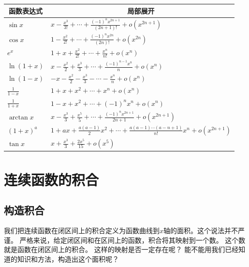 \documentclass[12pt,UTF8]{ctexbook}
\newcommand{\olim}[1]{\mathit{o}\left(#1\right)}  %
\begin{document}
\begin{appendix}
\begin{center}
    \renewcommand{\arraystretch}{2}
    \setlength{\extrarowheight}{-3pt}
    \begin{longtable}{|l|l|}
        \hline \multicolumn{1}{|c|}{\textbf{函数表达式}} & \multicolumn{1}{c|}{\textbf{局部展开}} \\[4pt] 
        \hline    
        $\sin{x}$ & $x - \frac{x^3}{3!} + \cdots + \frac{(-1)^n x^{2n+1}}{(2n+1)!} + \olim{x^{2n+1}} $ \\[4pt]
        \hline
        $\cos{x}$ & $1 - \frac{x^2}{2!} + \cdots + \frac{(-1)^n x^{2n}}{(2n)!} + \olim{x^{2n}} $ \\[4pt]
        \hline
        $e^x$ & $1 + x + \frac{x^2}{2!} + \cdots + \frac{x^n}{n!} + \olim{x^n}$ \\[4pt]
        \hline
        $\ln{(1 + x)}$ & $x - \frac{x^2}{2} + \frac{x^3}{3} + \cdots + \frac{(-1)^{n-1}x^{n}}{n} + \olim{x^{n}}$ \\[4pt]  
        \hline
        $\ln{(1 - x)}$ & $- x - \frac{x^2}{2} - \frac{x^3}{3} - \cdots - \frac{x^{n}}{n} + \olim{x^{n}}$ \\[4pt]  
        \hline
        $\frac{1}{1 - x}$ & $1 + x + x^2 + \cdots + x^n + \olim{x^{n}}$ \\[4pt]  
        \hline
        $\frac{1}{1 + x}$ & $1 - x + x^2 + \cdots + (-1)^n x^n + \olim{x^{n}}$ \\[4pt]  
        \hline
        $\arctan{x}$ & $x - \frac{x^3}{3} + \frac{x^5}{5} + \cdots + \frac{(-1)^n x^{2n+1}}{2n+1} + \olim{x^{2n+1}}$ \\[4pt]  
        \hline
        $(1 + x)^a$ & $1 + ax + \frac{a(a - 1)}{2}x^2 + \cdots + \frac{a(a - 1)\cdots(a - n + 1)}{n!}x^n + \olim{x^{2n+1}}$ \\[4pt] 
        \hline
        $\tan{x}$ & $x + \frac{x^3}{3} + \frac{2x^5}{15} + \olim{x^{5}}$ \\[4pt]
        \hline
    \end{longtable}
\end{center}

\chapter{连续函数的积合}

\section{构造积合}

我们把连续函数在闭区间上的积合定义为函数曲线到$x$轴的面积。这个说法并不严谨。
严格来说，给定闭区间和在区间上的函数，积合将其映射到一个数。
这个数就是函数在闭区间上的积合。
这样的映射是否一定存在呢？
能不能用我们已经知道的知识和方法，构造出这个面积呢？


\end{appendix}
\end{document}
